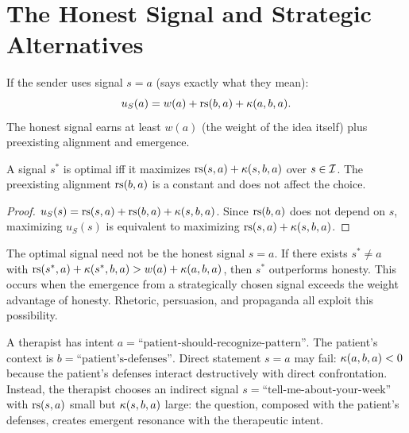 \section{The Honest Signal and Strategic Alternatives}

\begin{corollary}
\label{cor:honest-signal}
If the sender uses signal $s = a$ (says exactly what they mean):
\[
u_S(a) = w(a) + \mathrm{rs}(b, a) + \kappa(a, b, a).
\]
The honest signal earns at least $w(a)$ (the weight of the idea itself)
plus preexisting alignment and emergence.
\end{corollary}

\begin{theorem}
\label{thm:optimal-signal}
A signal $s^*$ is optimal iff it maximizes $\mathrm{rs}(s, a) + \kappa(s, b, a)$
over $s \in \mathcal{I}$. The preexisting alignment $\mathrm{rs}(b, a)$ is a constant and
does not affect the choice.
\end{theorem}

\begin{proof}
$u_S(s) = \mathrm{rs}(s,a) + \mathrm{rs}(b,a) + \kappa(s,b,a)$. Since $\mathrm{rs}(b,a)$ does not
depend on $s$, maximizing $u_S(s)$ is equivalent to maximizing
$\mathrm{rs}(s,a) + \kappa(s,b,a)$.
\end{proof}

\begin{remark}
The optimal signal need not be the honest signal $s = a$. If there exists
$s^* \neq a$ with $\mathrm{rs}(s^*, a) + \kappa(s^*, b, a) > w(a) + \kappa(a, b, a)$,
then $s^*$ outperforms honesty. This occurs when the emergence from
a strategically chosen signal exceeds the weight advantage of honesty.
Rhetoric, persuasion, and propaganda all exploit this possibility.
\end{remark}

\begin{example}[Therapy]
A therapist has intent $a = \text{``patient-should-recognize-pattern''}$.
The patient's context is $b = \text{``patient's-defenses''}$. Direct
statement $s = a$ may fail: $\kappa(a, b, a) < 0$ because the patient's
defenses interact destructively with direct confrontation. Instead, the
therapist chooses an indirect signal $s = \text{``tell-me-about-your-week''}$
with $\mathrm{rs}(s, a)$ small but $\kappa(s, b, a)$ large: the question, composed
with the patient's defenses, creates emergent resonance with the therapeutic
intent.
\end{example}



